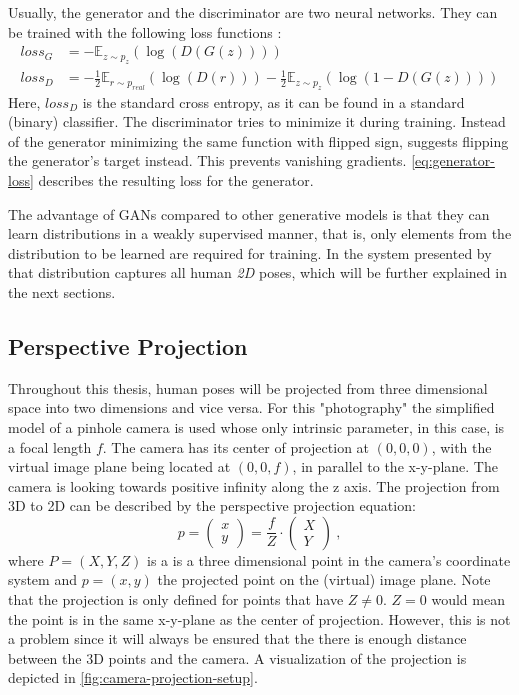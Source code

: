 Usually, the generator and the discriminator are two neural networks.
They can be trained with the following loss functions \cite{goodfellow17}:
\begin{align}
\label{eq:generator-loss}
loss_G &= -\mathbb{E}_{z\sim p_{z}}(\log(D(G(z)))) \\
\label{eq:discriminator-loss}
loss_D &= -\frac{1}{2}\mathbb{E}_{r\sim p_{real}}(\log(D(r))) - \frac{1}{2} \mathbb{E}_{z\sim p_{z}}(\log(1 - D(G(z))))
\end{align}
Here, $loss_D$ is the standard cross entropy, as it can be found in a standard (binary) classifier.
The discriminator tries to minimize it during training.
Instead of the generator minimizing the same function with flipped sign, \citet{goodfellow17} suggests flipping the generator's target instead.
This prevents vanishing gradients.
\autoref{eq:generator-loss} describes the resulting loss for the generator.

The advantage of GANs compared to other generative models is that they can learn distributions in a weakly supervised manner, that is, only elements from the distribution to be learned are required for training.
In the system presented by \citet{drover18} that distribution captures all human \emph{2D} poses, which will be further explained in the next sections.

\subsection{Perspective Projection}



Throughout this thesis, human poses will be projected from three dimensional space into two dimensions and vice versa.
For this "photography" the simplified model of a pinhole camera is used whose only intrinsic parameter, in this case, is a focal length $f$.
The camera has its center of projection at $(0, 0, 0)$, with the virtual image plane being located at $(0, 0, f)$, in parallel to the x-y-plane.
The camera is looking towards positive infinity along the z axis.
The projection from 3D to 2D can be described by the perspective projection equation:
\begin{equation}
	\label{eq:perspective-projection}
	p = 
	\begin{pmatrix}
	x\\
	y
	\end{pmatrix}
	= \frac{f}{Z} \cdot 	
	\begin{pmatrix}
	X\\
	Y
	\end{pmatrix} \ ,
\end{equation}
where $P = (X, Y, Z)$ is a is a three dimensional point in the camera's coordinate system and $p = (x, y)$ the projected point on the (virtual) image plane.
Note that the projection is only defined for points that have $Z \neq 0$.
$Z = 0$ would mean the point is in the same x-y-plane as the center of projection.
However, this is not a problem since it will always be ensured that the there is enough distance between the 3D points and the camera.
A visualization of the projection is depicted in \autoref{fig:camera-projection-setup}.


